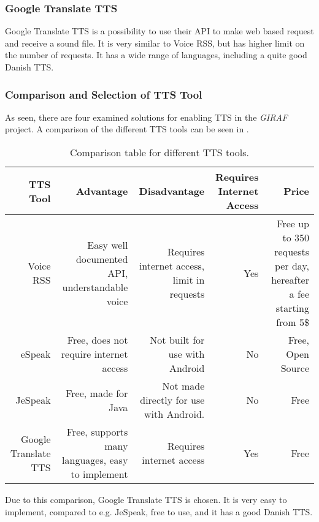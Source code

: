 \subsubsection{Google Translate TTS}
Google Translate TTS is a possibility to use their API to make web based request and receive a sound file. It is very similar to Voice RSS, but has higher limit on the number of requests. It has a wide range of languages, including a quite good Danish TTS. 

\subsubsection{Comparison and Selection of TTS Tool}
As seen, there are four examined solutions for enabling TTS in the \textit{GIRAF} project. A comparison of the different TTS tools can be seen in .

\begin{table}[h]
    \begin{tabularx}{1.1\textwidth}{|R|R|R|R|R|}
    \hline
    \textbf{TTS Tool}             &\textbf{Advantage}                                   &\textbf{Disadvantage}                               & \textbf{Requires Internet Access} &\textbf{Price}                                                      \\ \hline
    Voice RSS            & Easy well documented API, understandable voice    & Requires internet access, limit in requests & Yes                     & Free up to 350 requests per day, hereafter a fee starting from 5\$ \\ 
    eSpeak               & Free, does not require internet access            & Not built for use with Android             & No                      & Free, Open Source                                          \\ 
    JeSpeak              & Free, made for Java                             & Not made directly for use with Android.    & No                      & Free                                                       \\ 
    Google Translate TTS & Free, supports many languages, easy to implement & Requires internet access                    & Yes                     & Free                                                       \\ \hline
    \end{tabularx}
    \caption{Comparison table for different TTS tools.}
    \label{tab:ttscomp}
\end{table} 

Due to this comparison, Google Translate TTS is chosen. It is very easy to implement, compared to e.g. JeSpeak, free to use, and it has a good Danish TTS.